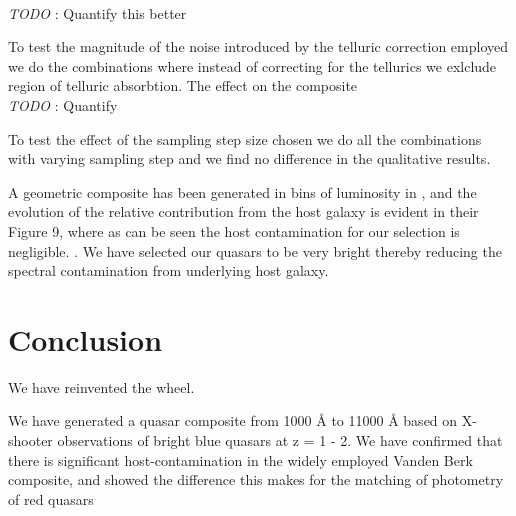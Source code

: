 \documentclass{aa}    %
\newcommand{\sectlabel}[1]{\label{sect:#1}}
\newcommand{\todo}[3]{{\color{#2}\emph{#1}: #3}}
\newcommand{\jstodo}[1]{\todo{ \\TODO }{green}{#1}}
\begin{document}
\jstodo{Quantify this better}



To test the magnitude of the noise introduced by the telluric correction employed we do the combinations where instead of correcting for the tellurics we exlclude region of telluric absorbtion. The effect on the composite  
\jstodo{Quantify}


To test the effect of the sampling step size chosen we do all the combinations with varying sampling step and we find no difference in the qualitative results. 

 
 
A geometric composite has been generated in bins of luminosity in \citep{Shen2011}, and the evolution of the relative contribution from the host galaxy is evident in their Figure 9, where as can be seen the host contamination for our selection is negligible.
 \citep{Volonteri2010a} \citep{Hopkins2007} . We have selected our quasars to be very bright thereby reducing the spectral contamination from underlying host galaxy. 









\section{Conclusion}  \sectlabel{conclusion}


We have reinvented the wheel.

We have generated a quasar composite from 1000 \r{A} to 11000 \r{A} based on X-shooter observations of bright blue quasars at z = 1 - 2. We have confirmed that there is significant host-contamination in the widely employed Vanden Berk composite, and showed the difference this makes for the matching of photometry of red quasars


%
 

%
%


%
\end{document}
